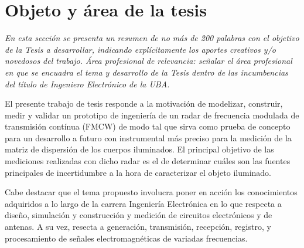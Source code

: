 \chapter{Objeto y área de la tesis} \label{ch:object}

\textit{En esta sección se presenta un resumen de no más de 200 palabras con el objetivo de la Tesis a desarrollar, indicando
explícitamente los aportes creativos y/o novedosos del trabajo. Área profesional de relevancia: señalar el área profesional en que
se encuadra el tema y desarrollo de la Tesis dentro de las incumbencias del título de Ingeniero Electrónico de la UBA.}

El presente trabajo de tesis responde a la motivación de modelizar, construir, medir y validar un prototipo de ingeniería de un radar de frecuencia modulada de transmisión contínua (FMCW) de modo tal que sirva como prueba de concepto para un desarrollo a futuro con instrumental más preciso para la medición de la matriz de dispersión de los cuerpos iluminados. El principal objetivo de las mediciones realizadas con dicho radar es el de determinar cuáles son las fuentes principales de incertidumbre a la hora de caracterizar el objeto iluminado.

Cabe destacar que el tema propuesto involucra poner en acción los conocimientos adquiridos a lo largo de la carrera Ingeniería Electrónica en lo que respecta a diseño, simulación y construcción y medición de circuitos electrónicos y de antenas. A su vez, resecta a generación, transmisión, recepción, registro, y procesamiento de señales electromagnéticas de variadas frecuencias.
